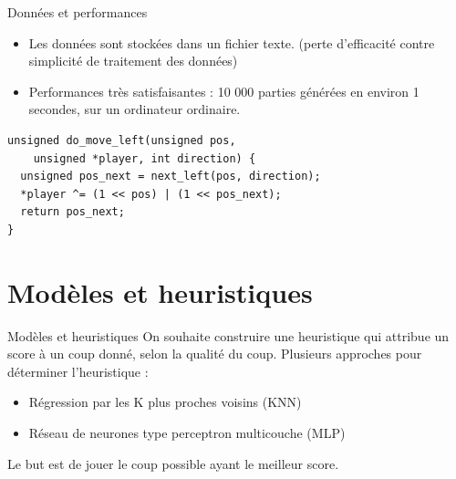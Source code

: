 \documentclass{beamer}
\begin{document}
\begin{frame}[fragile]{Données et performances}
    \begin{itemize}
        \item Les données sont stockées dans un fichier texte. \newline
              (perte d'efficacité contre simplicité de traitement des données)
        \item Performances très satisfaisantes : \newline
              \alert{10 000} parties générées en environ \alert{1 secondes}, sur un ordinateur ordinaire.
    \end{itemize}
    \begin{verbatim}
unsigned do_move_left(unsigned pos,
    unsigned *player, int direction) {
  unsigned pos_next = next_left(pos, direction);
  *player ^= (1 << pos) | (1 << pos_next);
  return pos_next;
}
    \end{verbatim}
\end{frame}

{\section{Modèles et heuristiques}}

\begin{frame}{Modèles et heuristiques}
    On souhaite construire une heuristique qui attribue un \alert{score} à un coup donné, selon la \alert{qualité} du coup.
    Plusieurs approches pour déterminer l'heuristique :
    \begin{itemize}
        \item Régression par les K plus proches voisins (KNN)
        \item Réseau de neurones type perceptron multicouche (MLP)
    \end{itemize}
    Le but est de jouer le coup possible ayant le meilleur score.
\end{frame}
\end{document}
